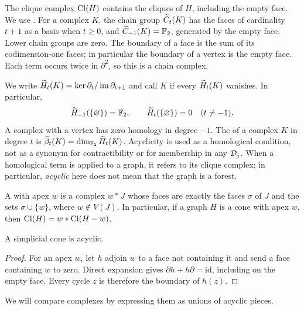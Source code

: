 The clique complex \(\operatorname{Cl}(H)\) contains the cliques of \(H\), including
the empty face. We use . For a complex \(K\), the chain group
\(\widetilde C_t(K)\) has the faces of cardinality \(t+1\) as a basis when
\(t\geq0\), and
\(\widetilde C_{-1}(K)=\mathbb F_2\), generated by the empty face. Lower chain groups
are zero. The boundary of a face is the sum of its codimension-one
faces; in particular the boundary of a vertex is the empty face.
Each term occurs twice in \(\partial^2\), so this is a chain complex.

We write \(\widetilde H_t(K)=\ker\partial_t/\operatorname{im}\partial_{t+1}\)
and call \(K\)  if every \(\widetilde H_t(K)\) vanishes.
In particular,
\begin{equation}\label{hom:eq:empty}
 \widetilde H_{-1}(\{\varnothing\})=\mathbb F_2,\qquad
 \widetilde H_t(\{\varnothing\})=0\quad(t\ne-1).
\end{equation}
A complex with a vertex has zero homology in degree \(-1\).
The  of a complex \(K\) in degree \(t\) is
\(\widetilde\beta_t(K)=\dim_{\mathbb F_2}\widetilde H_t(K)\).
Acyclicity is used as a homological condition, not as a synonym for
contractibility or for membership in any \(\mathcal D_j\).
When a homological term is applied to a graph, it refers to its clique
complex; in particular, \emph{acyclic} here does not mean that the graph is a forest.

A  with apex \(w\) is a complex
\(w*J\) whose faces are exactly the faces \(\sigma\) of \(J\)
and the sets \(\sigma\cup\{w\}\), where \(w\notin V(J)\).
In particular, if a graph \(H\) is a cone with apex \(w\), then
\(\operatorname{Cl}(H)=w*\operatorname{Cl}(H-w)\).

\begin{lemma}\label{hom:lem:cone}
A simplicial cone is acyclic.
\end{lemma}
\begin{proof}
For an apex \(w\), let \(h\) adjoin \(w\) to a face not containing it
and send a face containing \(w\) to zero. Direct expansion gives
\(\partial h+h\partial=\mathrm{id}\), including on the empty face.
Every cycle \(z\) is therefore the boundary of \(h(z)\).
\end{proof}

We will compare complexes by expressing them as unions of acyclic pieces.

